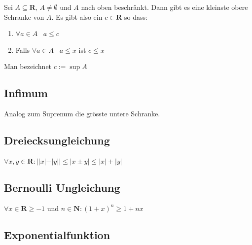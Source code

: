 \documentclass[8pt]{article}
\begin{document}
\begin{multicols*}{3}
Sei $A \subseteq \mathbf{R}$, $ A \neq \emptyset$ und $A$ nach oben beschränkt. Dann gibt es
eine kleinste obere Schranke von $A$. Es gibt also ein $c \in \mathbf{R}$ so dass:
\begin{enumerate}
  \item $\forall a \in A \; \; \; a \leq c$
  \item Falls $\forall a \in A \; \; \; a \leq x$ ist $c \leq x$
\end{enumerate}
Man bezeichnet $c := \sup A$ 

\subsection{Infimum}

Analog zum Suprenum die grösste untere Schranke.

\subsection{Dreiecksungleichung}

\begin{center}
  $\forall x, y \in \mathbf{R} : ||x| - |y|| \leq |x \pm y| \leq |x| + |y|$
\end{center}

\subsection{Bernoulli Ungleichung}

\begin{center}
  $ \forall x \in \mathbf{R} \geq -1$ und $n \in \mathbf{N}: (1 + x)^{n} \geq 1 + nx$
\end{center}

\subsection{Exponentialfunktion}


\end{multicols*}
\end{document}
